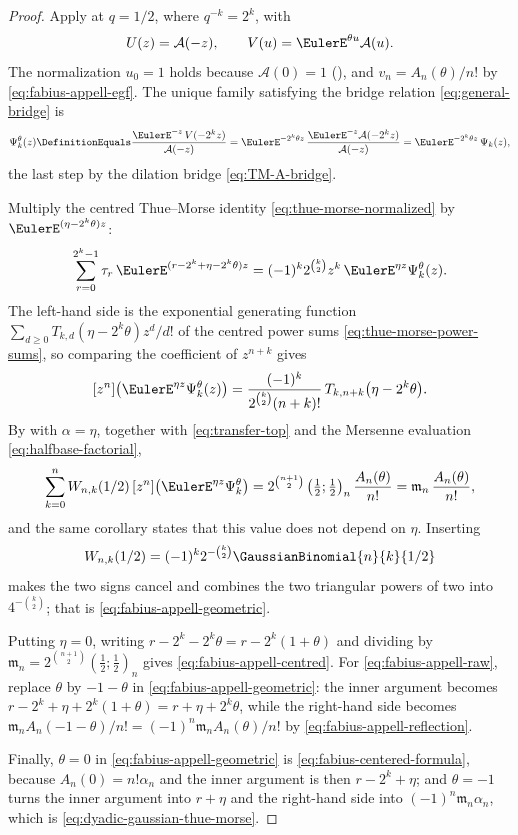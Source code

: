 \documentclass[11pt,a4paper,oneside,openany]{book}
\theoremstyle{definition}
\theoremstyle{remark}
\begin{document}
\begin{proof}
Apply  at $q=1/2$, where $q^{-k}=2^k$,
with
\[
 U(z)=\mathcal A(-z),\qquad V(u)=\EulerE^{\theta u}\mathcal A(u).
\]
The normalization $u_0=1$ holds because $\mathcal A(0)=1$
(), and $v_n=A_n(\theta)/n!$ by
\eqref{eq:fabius-appell-egf}.  The unique family satisfying the bridge relation
\eqref{eq:general-bridge} is
\[
 \Psi^{\theta}_k(z)\DefinitionEquals\frac{\EulerE^{-z}\,V(-2^kz)}{\mathcal A(-z)}
 =\EulerE^{-2^k\theta z}\,\frac{\EulerE^{-z}\mathcal A(-2^kz)}{\mathcal A(-z)}
 =\EulerE^{-2^k\theta z}\,\Psi_k(z),
\]
the last step by the dilation bridge \eqref{eq:TM-A-bridge}.

Multiply the centred Thue--Morse identity \eqref{eq:thue-morse-normalized} by
$\EulerE^{(\eta-2^k\theta)z}$:
\[
 \sum_{r=0}^{2^k-1}\tau_r\,\EulerE^{(r-2^k+\eta-2^k\theta)z}
 =(-1)^k2^{\binom k2}z^k\,\EulerE^{\eta z}\Psi^{\theta}_k(z).
\]
The left-hand side is the exponential generating function
$\sum_{d\ge0}T_{k,d}(\eta-2^k\theta)z^d/d!$ of the centred power sums
\eqref{eq:thue-morse-power-sums}, so comparing the coefficient of $z^{n+k}$
gives
\[
 [z^n]\bigl(\EulerE^{\eta z}\Psi^{\theta}_k(z)\bigr)
 =\frac{(-1)^k}{2^{\binom k2}(n+k)!}\,
  T_{k,n+k}\bigl(\eta-2^k\theta\bigr).
\]
By  with $\alpha=\eta$, together with
\eqref{eq:transfer-top} and the Mersenne evaluation
\eqref{eq:halfbase-factorial},
\[
 \sum_{k=0}^{n}W_{n,k}(1/2)\,[z^n]\bigl(\EulerE^{\eta z}\Psi^{\theta}_k\bigr)
 =2^{\binom{n+1}{2}}\left(\tfrac12;\tfrac12\right)_n\frac{A_n(\theta)}{n!}
 =\mathfrak m_n\,\frac{A_n(\theta)}{n!},
\]
and the same corollary states that this value does not depend on $\eta$.
Inserting
\[
 W_{n,k}(1/2)=(-1)^k2^{-\binom k2}\GaussianBinomial{n}{k}{1/2}
\]
makes the two signs cancel and combines the two triangular powers of two into
$4^{-\binom k2}$; that
is \eqref{eq:fabius-appell-geometric}.

Putting $\eta=0$, writing $r-2^k-2^k\theta=r-2^k(1+\theta)$ and dividing by
$\mathfrak m_n=2^{\binom{n+1}{2}}\left(\tfrac12;\tfrac12\right)_n$ gives
\eqref{eq:fabius-appell-centred}.  For \eqref{eq:fabius-appell-raw}, replace
$\theta$ by $-1-\theta$ in \eqref{eq:fabius-appell-geometric}: the inner argument
becomes $r-2^k+\eta+2^k(1+\theta)=r+\eta+2^k\theta$, while the right-hand side
becomes $\mathfrak m_nA_n(-1-\theta)/n!=(-1)^n\mathfrak m_nA_n(\theta)/n!$ by
\eqref{eq:fabius-appell-reflection}.

Finally, $\theta=0$ in \eqref{eq:fabius-appell-geometric} is
\eqref{eq:fabius-centered-formula}, because $A_n(0)=n!\alpha_n$ and the inner
argument is then $r-2^k+\eta$; and $\theta=-1$ turns the inner argument into
$r+\eta$ and the right-hand side into $(-1)^n\mathfrak m_n\alpha_n$, which is
\eqref{eq:dyadic-gaussian-thue-morse}.
\end{proof}
\end{document}
